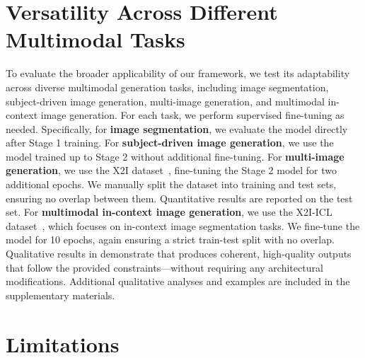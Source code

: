 



\section{Versatility Across Different Multimodal Tasks}
\label{app:applications}
To evaluate the broader applicability of our framework, we test its adaptability across diverse multimodal generation tasks, including image segmentation, subject-driven image generation, multi-image generation, and multimodal in-context image generation.
For each task, we perform supervised fine-tuning as needed. Specifically, for \textbf{image segmentation}, we evaluate the model directly after Stage 1 training. For \textbf{subject-driven image generation}, we use the model trained up to Stage 2 without additional fine-tuning.
For \textbf{multi-image generation}, we use the X2I dataset~\citep{OmniGen}, fine-tuning the Stage 2 model for two additional epochs. We manually split the dataset into training and test sets, ensuring no overlap between them. Quantitative results are reported on the test set.
For \textbf{multimodal in-context image generation}, we use the X2I-ICL dataset~\citep{OmniGen}, which focuses on in-context image segmentation tasks. We fine-tune the model for 10 epochs, again ensuring a strict train-test split with no overlap.
Qualitative results in  demonstrate that \model produces coherent, high-quality outputs that follow the provided constraints—without requiring any architectural modifications. Additional qualitative analyses and examples are included in the supplementary materials.



\section{Limitations}
\label{app:limitation}

